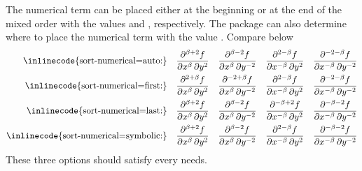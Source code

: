 	The numerical term can be placed either at the beginning or at the end of the mixed order with the values  and , respectively. The package can also determine where to place the numerical term with the value . Compare below
	\begin{align*}
		\text{\inlinecode{sort-numerical=auto:}}  && 
		\pdv[order={\beta, 2}, sort-numerical=auto]{f}{x,y}   &&
		\pdv[order={\beta, -2}, sort-numerical=auto]{f}{x,y}  &&
		\pdv[order={-\beta, 2}, sort-numerical=auto]{f}{x,y}  &&
		\pdv[order={-\beta, -2}, sort-numerical=auto]{f}{x,y} \\
		\text{\inlinecode{sort-numerical=first:}} &&
		\pdv[order={\beta, 2}, sort-numerical=first]{f}{x,y}   &&   \pdv[order={\beta, -2}, sort-numerical=first]{f}{x,y}  &&   \pdv[order={-\beta, 2}, sort-numerical=first]{f}{x,y}  &&   \pdv[order={-\beta, -2}, sort-numerical=first]{f}{x,y} \\
		\text{\inlinecode{sort-numerical=last:}}  &&
		\pdv[order={\beta, 2}, sort-numerical=last]{f}{x,y}   &&   \pdv[order={\beta, -2}, sort-numerical=last]{f}{x,y}  &&   \pdv[order={-\beta, 2}, sort-numerical=last]{f}{x,y}  &&   \pdv[order={-\beta, -2}, sort-numerical=last]{f}{x,y} \\
		\text{\inlinecode{sort-numerical=symbolic:}}  && 
		\pdv[order={\beta, 2}, sort-numerical=symbolic]{f}{x,y}   &&   \pdv[order={\beta, -2}, sort-numerical=symbolic]{f}{x,y}  &&   \pdv[order={-\beta, 2}, sort-numerical=symbolic]{f}{x,y}  &&   \pdv[order={-\beta, -2}, sort-numerical=symbolic]{f}{x,y}
	\end{align*}
	These three options should satisfy every needs.
	
